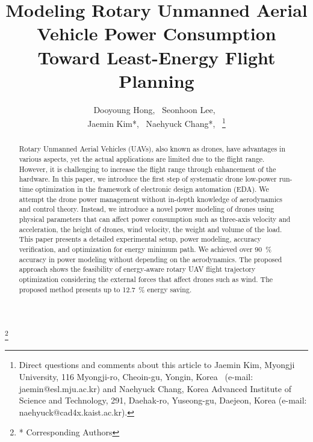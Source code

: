 \documentclass[journal]{./template/IEEEtran}
\begin{document}
\makeatletter

\newcommand\blfootnote[1]{%
  \begingroup
  \renewcommand\thefootnote{}\footnote{#1}%
  \addtocounter{footnote}{-1}%
  \endgroup
}

\newcommand\fs@norules{\def\@fs@cfont{\bfseries}\let\@fs@capt\floatc@ruled
  \def\@fs@pre{}%
  \def\@fs@post{}%
  \def\@fs@mid{\kern3pt}%
  \let\@fs@iftopcapt\iftrue}
\makeatother
{}

\title{Modeling Rotary Unmanned Aerial Vehicle Power Consumption Toward Least-Energy Flight Planning\\
}
\author{
Dooyoung Hong,~
Seonhoon Lee,~\\
Jaemin Kim*,~
Naehyuck Chang*,~
\thanks{Direct questions and comments about this article to Jaemin Kim, Myongji University, 116 Myongji-ro, Cheoin-gu, Yongin, Korea~ (e-mail: jaemin@esl.mju.ac.kr) and Naehyuck Chang, Korea Advanced Institute of Science and Technology, 291, Daehak-ro, Yuseong-gu, Daejeon, Korea (e-mail: naehyuck@cad4x.kaist.ac.kr).}
}
\maketitle
\blfootnote{* Corresponding Authors}

\begin{abstract}

Rotary Unmanned Aerial Vehicles (UAVs), also known as drones, have advantages in various aspects, yet the actual applications are limited due to the flight range. However, it is challenging to increase the flight range through enhancement of the hardware. 
In this paper, we introduce the first step of systematic drone low-power run-time optimization in the framework of electronic design automation (EDA). 
We attempt the drone power management without in-depth knowledge of aerodynamics and control theory. 
Instead, we introduce a novel power modeling of drones using physical parameters that can affect power consumption such as three-axis velocity and acceleration, the height of drones, wind velocity, the weight and volume of the load. 
This paper presents a detailed experimental setup, power modeling, accuracy verification, and optimization for energy minimum path. 
We achieved over 90~\% accuracy in power modeling without depending on the aerodynamics. 
The proposed approach shows the feasibility of energy-aware rotary UAV flight trajectory optimization considering the external forces that affect drones such as wind. The proposed method presents up to 12.7~\% energy saving.
\label{Section: abstract}
\end{abstract}
\end{document}
